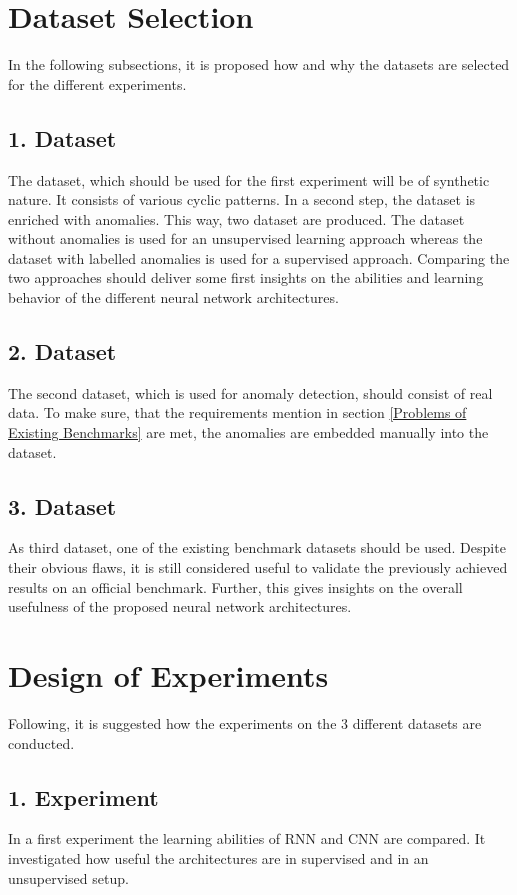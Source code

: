 \section{Dataset Selection}
In the following subsections, it is proposed how and why the datasets are selected for the different experiments.

\subsection{1. Dataset}
The dataset, which should be used for the first experiment will be of synthetic nature. It consists of various cyclic patterns. In a second step, the dataset is enriched with anomalies. This way, two dataset are produced. The dataset without anomalies is used for an unsupervised learning approach whereas the dataset with labelled anomalies is used for a supervised approach. Comparing the two approaches should deliver some first insights on the abilities and learning behavior of the different neural network architectures.   

\subsection{2. Dataset}
The second dataset, which is used for anomaly detection, should consist of real data. To make sure, that the requirements mention in section \ref{Problems of Existing Benchmarks} are met, the anomalies are embedded manually into the dataset. 

\subsection{3. Dataset}
As third dataset, one of the existing benchmark datasets should be used. Despite their obvious flaws, it is still considered useful to validate the previously achieved results on an official benchmark. Further, this gives insights on the overall usefulness of the proposed neural network architectures.

\section{Design of Experiments}
Following, it is suggested how the experiments on the 3 different datasets are conducted.

\subsection{1. Experiment}
In a first experiment the learning abilities of RNN and CNN are compared. It investigated how useful the architectures are in supervised and in an unsupervised setup. 


 